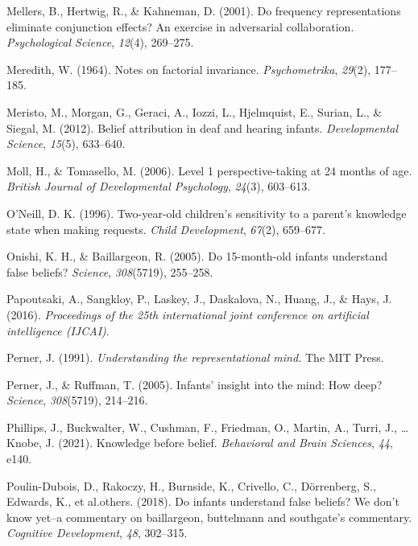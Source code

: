 \documentclass[
  man,floatsintext]{apa6}
\newlength{\cslhangindent}
\newenvironment{CSLReferences}[2] %
 {\begin{list}{}{%
  \setlength{\itemindent}{0pt}
  \setlength{\leftmargin}{0pt}
  \setlength{\parsep}{0pt}
  \ifodd #1
   \setlength{\leftmargin}{\cslhangindent}
   \setlength{\itemindent}{-1\cslhangindent}
  \fi
  \setlength{\itemsep}{#2\baselineskip}}}
 {\end{list}}
\begin{document}
\begin{CSLReferences}{1}{0}
Mellers, B., Hertwig, R., \& Kahneman, D. (2001). Do frequency representations eliminate conjunction effects? An exercise in adversarial collaboration. \emph{Psychological Science}, \emph{12}(4), 269--275.

Meredith, W. (1964). Notes on factorial invariance. \emph{Psychometrika}, \emph{29}(2), 177--185.

Meristo, M., Morgan, G., Geraci, A., Iozzi, L., Hjelmquist, E., Surian, L., \& Siegal, M. (2012). Belief attribution in deaf and hearing infants. \emph{Developmental Science}, \emph{15}(5), 633--640.

Moll, H., \& Tomasello, M. (2006). Level 1 perspective-taking at 24 months of age. \emph{British Journal of Developmental Psychology}, \emph{24}(3), 603--613.

O'Neill, D. K. (1996). Two-year-old children's sensitivity to a parent's knowledge state when making requests. \emph{Child Development}, \emph{67}(2), 659--677.

Onishi, K. H., \& Baillargeon, R. (2005). Do 15-month-old infants understand false beliefs? \emph{Science}, \emph{308}(5719), 255--258.

Papoutsaki, A., Sangkloy, P., Laskey, J., Daskalova, N., Huang, J., \& Hays, J. (2016). \emph{Proceedings of the 25th international joint conference on artificial intelligence (IJCAI)}.

Perner, J. (1991). \emph{Understanding the representational mind.} The MIT Press.

Perner, J., \& Ruffman, T. (2005). Infants' insight into the mind: How deep? \emph{Science}, \emph{308}(5719), 214--216.

Phillips, J., Buckwalter, W., Cushman, F., Friedman, O., Martin, A., Turri, J., \ldots{} Knobe, J. (2021). Knowledge before belief. \emph{Behavioral and Brain Sciences}, \emph{44}, e140.

Poulin-Dubois, D., Rakoczy, H., Burnside, K., Crivello, C., Dörrenberg, S., Edwards, K., et al.others. (2018). Do infants understand false beliefs? We don't know yet--a commentary on baillargeon, buttelmann and southgate's commentary. \emph{Cognitive Development}, \emph{48}, 302--315.


\end{CSLReferences}
\end{document}
